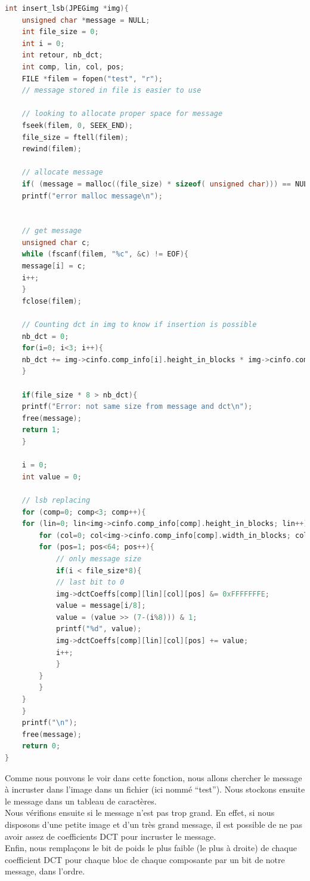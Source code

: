 \begin{lstlisting}[language=C, style=customc]
int insert_lsb(JPEGimg *img){
    unsigned char *message = NULL;
    int file_size = 0;
    int i = 0;
    int retour, nb_dct;
    int comp, lin, col, pos;
    FILE *filem = fopen("test", "r");
    // message stored in file is easier to use

    // looking to allocate proper space for message
    fseek(filem, 0, SEEK_END);
    file_size = ftell(filem);
    rewind(filem);

    // allocate message
    if( (message = malloc((file_size) * sizeof( unsigned char))) == NULL )
	printf("error malloc message\n");


    // get message
    unsigned char c;
    while (fscanf(filem, "%c", &c) != EOF){
	message[i] = c;
	i++;
    }
    fclose(filem);

    // Counting dct in img to know if insertion is possible
    nb_dct = 0;
    for(i=0; i<3; i++){
	nb_dct += img->cinfo.comp_info[i].height_in_blocks * img->cinfo.comp_info[i].width_in_blocks * 64;
    }
    
    if(file_size * 8 > nb_dct){
	printf("Error: not same size from message and dct\n");
	free(message);
	return 1;
    }

    i = 0;
    int value = 0;
    
    // lsb replacing
    for (comp=0; comp<3; comp++){
	for (lin=0; lin<img->cinfo.comp_info[comp].height_in_blocks; lin++){
	    for (col=0; col<img->cinfo.comp_info[comp].width_in_blocks; col++){
		for (pos=1; pos<64; pos++){
		    // only message size
		    if(i < file_size*8){
			// last bit to 0
			img->dctCoeffs[comp][lin][col][pos] &= 0xFFFFFFFE;
			value = message[i/8];
			value = (value >> (7-(i%8))) & 1;
			printf("%d", value);
			img->dctCoeffs[comp][lin][col][pos] += value;
			i++;
		    }
		}
	    }
	}
    }
    printf("\n");
    free(message);
    return 0;
}
\end{lstlisting}
Comme nous pouvons le voir dans cette fonction, nous allons chercher le message à incruster dans l'image dans un fichier (ici nommé \enquote{test}). Nous stockons ensuite le message dans un tableau de caractères.\\
Nous vérifions ensuite si le message n'est pas trop grand. En effet, si nous disposons d'une petite image et d'un très grand message, il est possible de ne pas avoir assez de coefficients DCT pour incruster le message.\\
Enfin, nous remplaçons le bit de poids le plus faible (le plus à droite) de chaque coefficient DCT pour chaque bloc de chaque composante par un bit de notre message, dans l'ordre.\\\par
